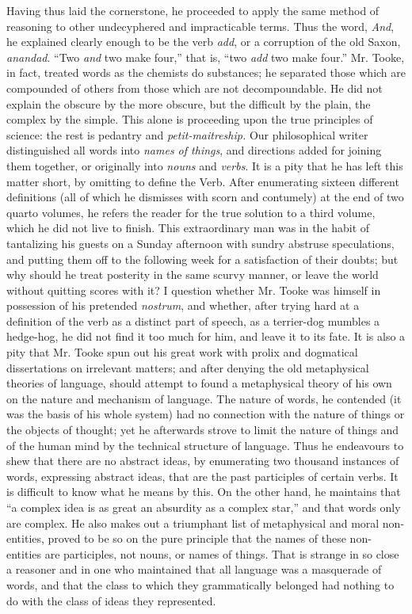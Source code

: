 {Having thus laid the cornerstone,
  he proceeded to apply the same method of reasoning to other
  undecyphered and impracticable terms.} Thus the word,
\emph{And}, he explained clearly enough to be the verb \emph{add},
or a corruption of the old Saxon, \emph{anandad}. ``Two \emph{and}
two make four,'' that is, ``two \emph{add} two make four.''
Mr. Tooke, in fact, treated words as the chemists do substances;
he separated those which are compounded of others from those which
are not decompoundable. He did not explain the obscure by the more
obscure, but the difficult by the plain, the complex by the
simple. This alone is proceeding upon the true principles of
science: the rest is pedantry and \emph{petit-maitreship.} Our
philosophical writer distinguished all words into \emph{names of
  things}, and directions added for joining them together, or
originally into \emph{nouns} and \emph{verbs}.  It is a pity that
he has left this matter short, by omitting to define the
Verb. After enumerating sixteen different definitions (all of
which he dismisses with scorn and contumely) at the end of two
quarto volumes, he refers the reader for the true solution to a
third volume, which he did not live to finish. This extraordinary
man was in the habit of tantalizing his guests on a Sunday
afternoon with sundry abstruse speculations, and putting them off
to the following week for a satisfaction of their doubts; but why
should he treat posterity in the same scurvy manner, or leave the
world without quitting scores with it?  I question whether
Mr. Tooke was himself in possession of his pretended
\emph{nostrum}, and whether, after trying hard at a definition of
the verb as a distinct part of speech, as a terrier-dog mumbles a
hedge-hog, he did not find it too much for him, and leave it to
its fate. It is also a pity that Mr. Tooke spun out his great work
with prolix and dogmatical dissertations on irrelevant matters;
and after denying the old metaphysical theories of language,
should attempt to found a metaphysical theory of his own on the
nature and mechanism of language.  The nature of words, he
contended (it was the basis of his whole system) had no connection
with the nature of things or the objects of thought; yet he
afterwards strove to limit the nature of things and of the human
mind by the technical structure of language. Thus he endeavours to
shew that there are no abstract ideas, by enumerating two thousand
instances of words, expressing abstract ideas, that are the past
participles of certain verbs. It is difficult to know what he
means by this. On the other hand, he maintains that ``a complex
idea is as great an absurdity as a complex star,'' and that words
only are complex. He also makes out a triumphant list of
metaphysical and moral non-entities, proved to be so on the pure
principle that the names of these non-entities are participles,
not nouns, or names of things. That is strange in so close a
reasoner and in one who maintained that all language was a
masquerade of words, and that the class to which they
grammatically belonged had nothing to do with the class of ideas
they represented.

